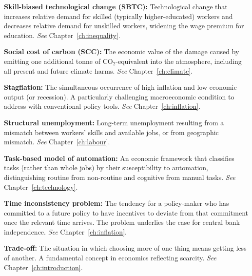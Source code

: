 \vspace{6pt}
\noindent\textbf{Skill-biased technological change (SBTC):} Technological change that increases relative demand for skilled (typically higher-educated) workers and decreases relative demand for unskilled workers, widening the wage premium for education. \textit{See} Chapter~\ref{ch:inequality}.

\vspace{6pt}
\noindent\textbf{Social cost of carbon (SCC):} The economic value of the damage caused by emitting one additional tonne of CO$_2$-equivalent into the atmosphere, including all present and future climate harms. \textit{See} Chapter~\ref{ch:climate}.

\vspace{6pt}
\noindent\textbf{Stagflation:} The simultaneous occurrence of high inflation and low economic output (or recession). A particularly challenging macroeconomic condition to address with conventional policy tools. \textit{See} Chapter~\ref{ch:inflation}.

\vspace{6pt}
\noindent\textbf{Structural unemployment:} Long-term unemployment resulting from a mismatch between workers' skills and available jobs, or from geographic mismatch. \textit{See} Chapter~\ref{ch:labour}.

\vspace{6pt}
\noindent\textbf{Task-based model of automation:} An economic framework that classifies tasks (rather than whole jobs) by their susceptibility to automation, distinguishing routine from non-routine and cognitive from manual tasks. \textit{See} Chapter~\ref{ch:technology}.

\vspace{6pt}
\noindent\textbf{Time inconsistency problem:} The tendency for a policy-maker who has committed to a future policy to have incentives to deviate from that commitment once the relevant time arrives. The problem underlies the case for central bank independence. \textit{See} Chapter~\ref{ch:inflation}.

\vspace{6pt}
\noindent\textbf{Trade-off:} The situation in which choosing more of one thing means getting less of another. A fundamental concept in economics reflecting scarcity. \textit{See} Chapter~\ref{ch:introduction}.

